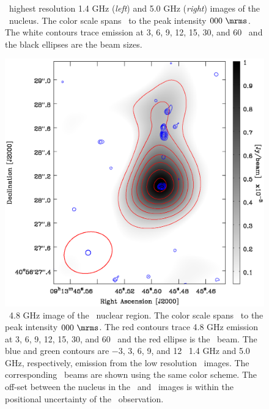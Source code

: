 \begin{figure}
\begin{center}
\begin{minipage}{0.495\linewidth}
    \end{minipage}
    \caption{\vlba\ highest resolution 1.4 GHz ({\it{left}}) and 5.0
      GHz ({\it{right}}) images of the \irs\ nucleus. The color scale
      spans \srms\ to the peak intensity $000 ~\mrms$. The white
      contours trace emission at 3, 6, 9, 12, 15, 30, and 60
      \srms\ and the black ellipses are the beam sizes.}
    \label{fig:high}
  \end{center}
\end{figure}

\begin{figure}
  \begin{center}
    \begin{minipage}{\linewidth}
      \includegraphics*[width=\textwidth, trim=0mm 0mm 0mm 0mm, clip]{composite.eps}
      \caption{\vla\ 4.8 GHz image of the \irs\ nuclear region. The
        color scale spans \srms\ to the peak intensity $000
        ~\mrms$. The red contours trace 4.8 GHz emission at 3, 6, 9,
        12, 15, 30, and 60 \srms\ and the red ellipse is the
        \vla\ beam. The blue and green contours are $-3$, 3, 6, 9, and
        12 \srms\ 1.4 GHz and 5.0 GHz, respectively, emission from the
        low resolution \vlba\ images. The corresponding \vlba\ beams
        are shown using the same color scheme. The off-set between the
        nucleus in the \vla\ and \vlba\ images is within the
        positional uncertainty of the \vla\ observation.}
      \label{fig:comp}
    \end{minipage}
  \end{center}
\end{figure}

